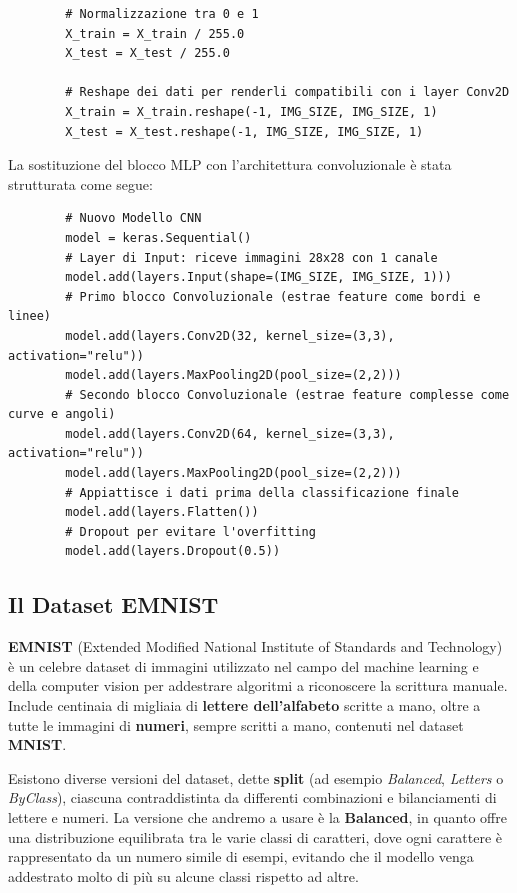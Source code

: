 \documentclass[12pt,a4paper]{article}
\begin{document}
	\begin{lstlisting}
		# Normalizzazione tra 0 e 1
		X_train = X_train / 255.0
		X_test = X_test / 255.0

		# Reshape dei dati per renderli compatibili con i layer Conv2D
		X_train = X_train.reshape(-1, IMG_SIZE, IMG_SIZE, 1)
		X_test = X_test.reshape(-1, IMG_SIZE, IMG_SIZE, 1)
	\end{lstlisting}

	La sostituzione del blocco MLP con l'architettura convoluzionale è stata strutturata come segue:
	\begin{lstlisting}
		# Nuovo Modello CNN
		model = keras.Sequential()
		# Layer di Input: riceve immagini 28x28 con 1 canale
		model.add(layers.Input(shape=(IMG_SIZE, IMG_SIZE, 1)))
		# Primo blocco Convoluzionale (estrae feature come bordi e linee)
		model.add(layers.Conv2D(32, kernel_size=(3,3), activation="relu"))
		model.add(layers.MaxPooling2D(pool_size=(2,2)))
		# Secondo blocco Convoluzionale (estrae feature complesse come curve e angoli)
		model.add(layers.Conv2D(64, kernel_size=(3,3), activation="relu"))
		model.add(layers.MaxPooling2D(pool_size=(2,2)))
		# Appiattisce i dati prima della classificazione finale
		model.add(layers.Flatten())
		# Dropout per evitare l'overfitting
		model.add(layers.Dropout(0.5))
	\end{lstlisting}

	\subsection{Il Dataset EMNIST}
	\textbf{EMNIST} (Extended Modified National Institute of Standards and Technology) è un celebre dataset di immagini utilizzato nel campo del machine learning e della computer vision per addestrare algoritmi a riconoscere la scrittura manuale. \newline
	Include centinaia di migliaia di \textbf{lettere dell'alfabeto} scritte a mano, oltre a tutte le immagini di \textbf{numeri}, sempre scritti a mano, contenuti nel dataset \textbf{MNIST}.
	\medskip

	Esistono diverse versioni del dataset, dette \textbf{split} (ad esempio \textit{Balanced}, \textit{Letters} o \textit{ByClass}), ciascuna contraddistinta da differenti combinazioni e bilanciamenti di lettere e numeri. \newline
	La versione che andremo a usare è la \textbf{Balanced}, in quanto offre una distribuzione equilibrata tra le varie classi di caratteri, dove ogni carattere è rappresentato da un numero simile di esempi, evitando che il modello venga addestrato molto di più su alcune classi rispetto ad altre.
	\bigskip
\end{document}
